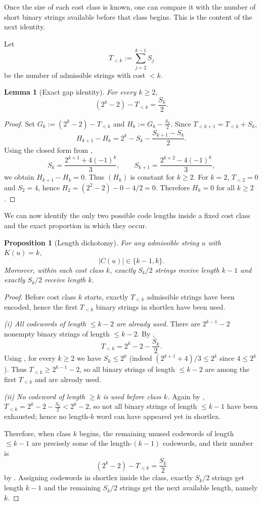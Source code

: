 \documentclass[10pt,a4paper]{article}
\newtheorem{lemma}{Lemma}
\newtheorem{proposition}{Proposition}
\theoremstyle{definition}
\theoremstyle{remark}
\newcommand{\1}{\mathbf{1}}
\begin{document}
Once the size of each cost class is known, one can compare it with the number of short binary strings available before that class begins. This is the content of the next identity.

Let
\[
T_{<k}:=\sum_{j=2}^{k-1} S_j
\]
be the number of admissible strings with cost $<k$.

\begin{lemma}[Exact gap identity]\label{lem:gap}
For every $k\ge 2$,
\[
(2^k-2)-T_{<k}=\frac{S_k}{2}.
\]
\end{lemma}

\begin{proof}
Set $G_k:=(2^k-2)-T_{<k}$ and $H_k:=G_k-\frac{S_k}{2}$.
Since $T_{<k+1}=T_{<k}+S_k$,
\[
H_{k+1}-H_k
=2^k-S_k-\frac{S_{k+1}-S_k}{2}.
\]
Using the closed form from ,
\[
S_k=\frac{2^{k+1}+4(-1)^k}{3},\qquad
S_{k+1}=\frac{2^{k+2}-4(-1)^k}{3},
\]
we obtain $H_{k+1}-H_k=0$. Thus $(H_k)$ is constant for $k\ge2$.
For $k=2$, $T_{<2}=0$ and $S_2=4$, hence $H_2=(2^2-2)-0-4/2=0$. Therefore $H_k=0$ for all $k\ge2$.
\end{proof}

We can now identify the only two possible code lengths inside a fixed cost class and the exact proportion in which they occur.

\begin{proposition}[Length dichotomy]\label{prop:dichotomy}
For any admissible string $u$ with $K(u)=k$,
\[
|C(u)|\in\{k-1,k\}.
\]
Moreover, within each cost class $k$, exactly $S_k/2$ strings receive length $k-1$ and exactly $S_k/2$ receive length $k$.
\end{proposition}

\begin{proof}
Before cost class $k$ starts, exactly $T_{<k}$ admissible strings have been encoded, hence the first $T_{<k}$ binary strings in shortlex have been used.

\smallskip
\noindent\emph{(i) All codewords of length $\le k-2$ are already used.}
There are $2^{k-1}-2$ nonempty binary strings of length $\le k-2$.
By ,
\[
T_{<k}=2^k-2-\frac{S_k}{2}.
\]
Using , for every $k\ge2$ we have $S_k\le 2^k$ (indeed $(2^{k+1}+4)/3\le 2^k$ since $4\le 2^k$).
Thus $T_{<k}\ge 2^{k-1}-2$, so all binary strings of length $\le k-2$ are among the first $T_{<k}$ and are already used.

\smallskip
\noindent\emph{(ii) No codeword of length $\ge k$ is used before class $k$.}
Again by , $T_{<k}=2^k-2-\frac{S_k}{2}<2^k-2$, so not all binary strings of length $\le k-1$
have been exhausted; hence no length-$k$ word can have appeared yet in shortlex.

\smallskip
Therefore, when class $k$ begins, the remaining unused codewords of length $\le k-1$ are precisely some of the length-$(k-1)$ codewords, and their number is
\[
(2^k-2)-T_{<k}=\frac{S_k}{2}
\]
by . Assigning codewords in shortlex inside the class, exactly $S_k/2$ strings get length $k-1$ and the remaining $S_k/2$ strings get the next available length, namely $k$.
\end{proof}
\end{document}

